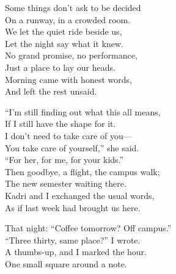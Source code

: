 \begin{lyrics}
Some things don’t ask to be decided\\
On a runway, in a crowded room.\\
We let the quiet ride beside us,\\
Let the night say what it knew.\\
No grand promise, no performance,\\
Just a place to lay our heads.\\
Morning came with honest words,\\
And left the rest unsaid.

“I’m still finding out what this all means,\\
If I still have the shape for it.\\
I don’t need to take care of you—\\
You take care of yourself,” she said.\\
“For her, for me, for your kids.”\\
Then goodbye, a flight, the campus walk;\\
The new semester waiting there.\\
Kadri and I exchanged the usual words,\\
As if last week had brought us here.

That night: “Coffee tomorrow? Off campus.”\\
“Three thirty, same place?” I wrote.\\
A thumbs-up, and I marked the hour.\\
One small square around a note.
\end{lyrics}

